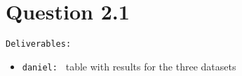 \section*{Question 2.1}

\texttt{Deliverables: } 
\begin{itemize}
	\item \texttt{daniel: } table with results for the three datasets 
\end{itemize}
